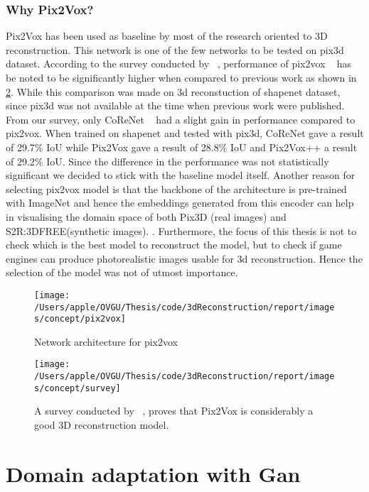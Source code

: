 \subsubsection{Why Pix2Vox?}
Pix2Vox has been used as baseline by most of the research oriented to 3D reconstruction.
This network is one of the few networks to be tested on pix3d dataset. According to the survey conducted by ~\cite{Han2021ImageBased3O},
performance of pix2vox ~\cite{Xie_2019} has be noted to be significantly higher when compared to previous work  as shown in \ref{fig:survey on 3d reconstruction}.
While this comparison was made on 3d reconstuction of shapenet dataset, since pix3d was not available at the time when previous work were published.
From our survey, only CoReNet ~\cite{popov2020corenet} had a slight gain in performance compared to pix2vox.
When trained on shapenet and tested with pix3d, CoReNet gave a result of 29.7\% IoU while Pix2Vox gave a result of 28.8\% IoU and Pix2Vox++ a result of 29.2\% IoU.
Since the difference in the performance was not statistically significant we decided to stick with the baseline model itself.
Another reason for selecting pix2vox model is that the backbone of the architecture is pre-trained with ImageNet and
hence the embeddings generated from this encoder can help in visualising the domain space of both Pix3D (real images) and S2R:3DFREE(synthetic images).
.
Furthermore, the focus of this thesis is not to check which is the best model to reconstruct the model, but to check if game engines can produce photorealistic images usable for 3d reconstruction.
Hence the selection of the model was not of utmost importance.

\begin{figure}
    \centering
    \texttt{[image: /Users/apple/OVGU/Thesis/code/3dReconstruction/report/images/concept/pix2vox]}
    \caption{Network architecture for pix2vox~\cite{Xie_2019}}
    \label{fig:pix2vox architecture}
\end{figure}

\begin{figure}
    \centering
    \texttt{[image: /Users/apple/OVGU/Thesis/code/3dReconstruction/report/images/concept/survey]}
    \caption{A survey conducted by ~\cite{Han2021ImageBased3O}, proves that Pix2Vox is considerably a good 3D reconstruction model.
    }
    \label{fig:survey on 3d reconstruction}
\end{figure}

\section{Domain adaptation with Gan }

